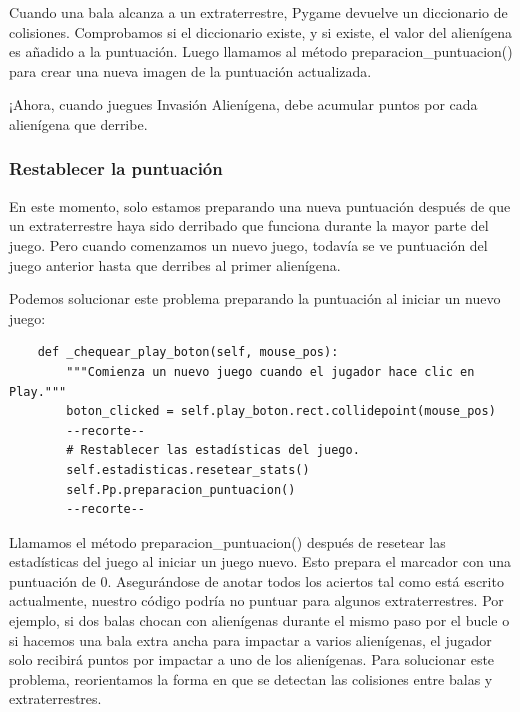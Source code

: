 Cuando una bala alcanza a un extraterrestre, Pygame devuelve un diccionario de colisiones.
Comprobamos si el diccionario existe, y si existe, el valor del alienígena es
añadido a la puntuación. Luego llamamos al método {\ttfamily preparacion\_puntuacion()} para crear una nueva imagen de la
puntuación actualizada.

¡Ahora, cuando juegues Invasión  Alienígena, debe acumular puntos por cada alienígena que derribe.

\subsubsection{Restablecer la puntuación}

En este momento, solo estamos preparando una nueva puntuación después de que un extraterrestre haya sido derribado
que funciona durante la mayor parte del juego. Pero cuando comenzamos un nuevo juego, todavía
se ve puntuación del juego anterior hasta que derribes al primer alienígena.

Podemos solucionar este problema preparando la puntuación al iniciar un nuevo juego:

\hspace{-2.4cm}{\ttfamily \scriptsize invasión}

\vspace{-0.2cm}
\hspace{-2.1cm}{\ttfamily \scriptsize \_alien.py}\vspace{-0.84cm} 
\begin{lstlisting}
    def _chequear_play_boton(self, mouse_pos):
        """Comienza un nuevo juego cuando el jugador hace clic en Play."""
        boton_clicked = self.play_boton.rect.collidepoint(mouse_pos)
		--recorte--
        # Restablecer las estadísticas del juego.
        self.estadisticas.resetear_stats()
        self.Pp.preparacion_puntuacion()
        --recorte--
\end{lstlisting}



Llamamos el método {\ttfamily preparacion\_puntuacion()} después de resetear las estadísticas del juego al iniciar un juego nuevo. 
Esto prepara el marcador con una puntuación de 0. 
Asegurándose de anotar todos los aciertos tal como está escrito actualmente,
nuestro código podría no puntuar para algunos extraterrestres. 
Por ejemplo, si dos balas chocan con alienígenas durante el mismo paso por el bucle o si hacemos una bala extra ancha para impactar a varios alienígenas, el jugador solo recibirá puntos por impactar a uno de los alienígenas.  Para solucionar este problema, reorientamos  la forma en que se detectan las colisiones entre balas y extraterrestres. 

